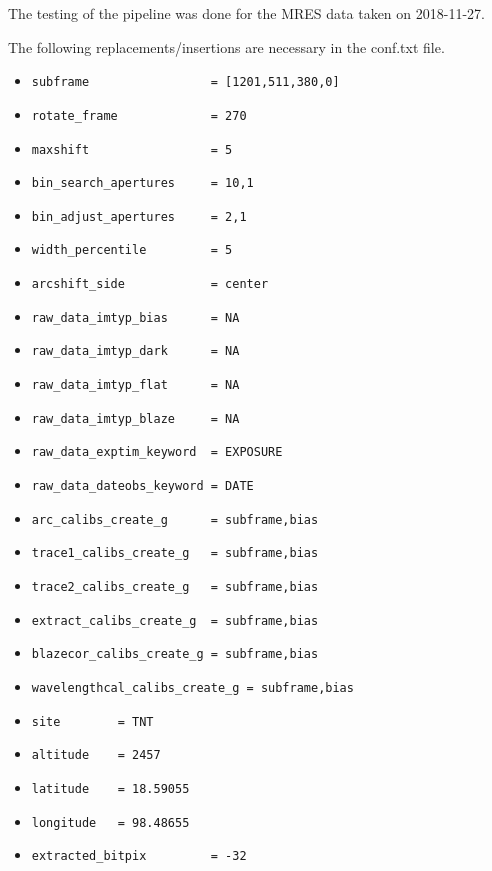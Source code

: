 \documentclass[10pt,a4paper]{article}
\begin{document}
The testing of the pipeline was done for the MRES data taken on 2018-11-27.

\noindent The following replacements/insertions are necessary in the conf.txt file. 
\begin{itemize}\small\setlength\itemsep{-0.1cm}
  \item \verb|subframe                 = [1201,511,380,0]|
  \item \verb|rotate_frame             = 270|
  \item \verb|maxshift                 = 5|
  \item \verb|bin_search_apertures     = 10,1|
  \item \verb|bin_adjust_apertures     = 2,1|
  \item \verb|width_percentile         = 5|
  \item \verb|arcshift_side            = center|
  \item \verb|raw_data_imtyp_bias      = NA|
  \item \verb|raw_data_imtyp_dark      = NA|
  \item \verb|raw_data_imtyp_flat      = NA|
  \item \verb|raw_data_imtyp_blaze     = NA|
  \item \verb|raw_data_exptim_keyword  = EXPOSURE|
  \item \verb|raw_data_dateobs_keyword = DATE|
  \item \verb|arc_calibs_create_g      = subframe,bias|
  \item \verb|trace1_calibs_create_g   = subframe,bias|
  \item \verb|trace2_calibs_create_g   = subframe,bias|
  \item \verb|extract_calibs_create_g  = subframe,bias|
  \item \verb|blazecor_calibs_create_g = subframe,bias|
  \item \verb|wavelengthcal_calibs_create_g = subframe,bias|
  \item \verb|site        = TNT|
  \item \verb|altitude    = 2457|
  \item \verb|latitude    = 18.59055|
  \item \verb|longitude   = 98.48655|
  \item \verb|extracted_bitpix         = -32|
\end{itemize}


\end{document}
